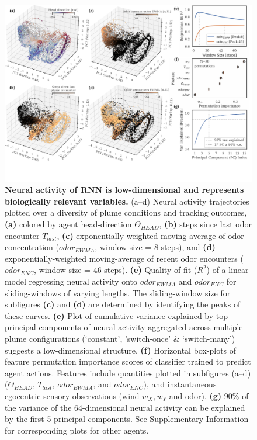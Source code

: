 \documentclass[5p,twocolumn,authoryear]{elsarticle}
\begin{document}
\begin{figure}[h!]
\begin{center}
\includegraphics[width=1.0\linewidth]{fig_repr.pdf} 
\caption{
\textbf{Neural activity of RNN is low-dimensional and represents biologically relevant variables.}
(a--d) 
Neural activity trajectories plotted over a diversity of plume conditions and tracking outcomes, 
\textbf{(a)} colored by agent head-direction $\Theta_{HEAD}$, 
\textbf{(b)} steps since last odor encounter $T_{last}$, 
\textbf{(c)} exponentially-weighted moving-average of odor concentration ($odor_{EWMA}$, window-size = 8 steps), and
\textbf{(d)} exponentially-weighted moving-average of recent odor encounters ($odor_{ENC}$, window-size = 46 steps).
\textbf{(e)}
Quality of fit ($R^2$) of a linear model regressing neural activity onto $odor_{EWMA}$ and $odor_{ENC}$ for sliding-windows of varying lengths. 
The sliding-window size for subfigures \textbf{(c)} and \textbf{(d)} are determined by identifying the peaks of these curves. 
\textbf{(e)} 
Plot of cumulative variance explained by top principal components of neural activity aggregated across multiple plume configurations (`constant', 'switch-once' \& `switch-many') suggests a low-dimensional structure. 
\textbf{(f)}
Horizontal box-plots of feature permutation importance scores of classifier trained to predict agent actions.
Features include quantities plotted in subfigures (a--d) 
($\Theta_{HEAD}$, $T_{last}$, $odor_{EWMA}$, and $odor_{ENC}$), 
and instantaneous egocentric sensory observations (wind $w_X, w_Y$ and odor).
\textbf{(g)} 
90$\%$ of the variance of the 64-dimensional neural activity can be explained by the first-5 principal components.
See Supplementary Information for corresponding plots for other agents.
}
\label{fig_representations}
\end{center}
\end{figure}
\end{document}
